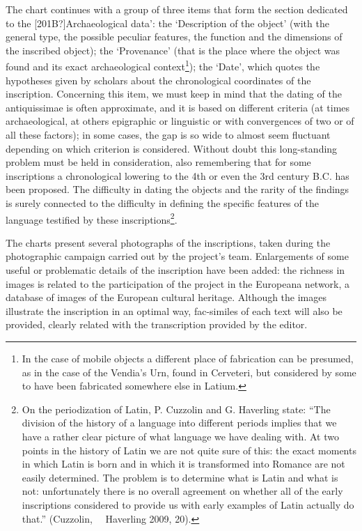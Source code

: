 \documentclass[amsthm,ebook]{saparticle}
\begin{document}
The chart continues with a group of three items that form the section dedicated to the [201B?]Archaeological data’: the
‘Description of the object’ (with the general type, the possible peculiar features, the function and the dimensions of
the inscribed object); the ‘Provenance’ (that is the place where the object was found and its exact archaeological
context\footnote{In the case of mobile objects a different place of fabrication can be presumed, as in the case of the
Vendia’s Urn, found in Cerveteri, but considered by some to have been fabricated somewhere else in Latium.}); the
‘Date’, which quotes the hypotheses given by scholars about the chronological coordinates of the inscription.
Concerning this item, we must keep in mind that the dating of the antiquissimae is often approximate, and it is based
on different criteria (at times archaeological, at others epigraphic or linguistic or with convergences of two or of
all these factors); in some cases, the gap is so wide to almost seem fluctuant depending on which criterion is
considered. Without doubt this long-standing problem must be held in consideration, also remembering that for some
inscriptions a chronological lowering to the 4th or even the 3rd century B.C. has been proposed. The difficulty in
dating the objects and the rarity of the findings is surely connected to the difficulty in defining the specific
features of the language testified by these inscriptions\footnote{On the periodization of Latin, P. Cuzzolin and G.
Haverling state: “The division of the history of a language into different periods implies that we have a rather clear
picture of what language we have dealing with. At two points in the history of Latin we are not quite sure of this: the
exact moments in which Latin is born and in which it is transformed into Romance are not easily determined. The problem
is to determine what is Latin and what is not: unfortunately there is no overall agreement on whether all of the early
inscriptions considered to provide us with early examples of Latin actually do that.” (Cuzzolin, \ \ Haverling 2009,
20).}.

The charts present several photographs of the inscriptions, taken during the photographic campaign carried out by the
project’s team. Enlargements of some useful or problematic details of the inscription have been added: the richness in
images is related to the participation of the project in the Europeana network, a database of images of the European
cultural heritage. Although the images illustrate the inscription in an optimal way, fac-similes of each text will also
be provided, clearly related with the transcription provided by the editor. 
\end{document}
